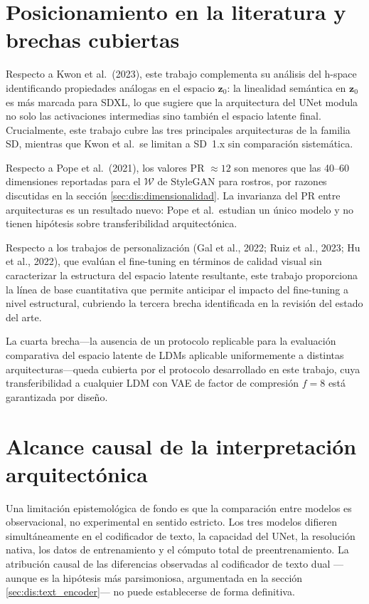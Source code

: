 \documentclass[12pt, a4paper, twoside]{book}
\newcommand{\z}{\mathbf{z}}
\begin{document}
\section{Posicionamiento en la literatura y brechas cubiertas}
\label{sec:dis:literatura}

Respecto a Kwon et al.\ (2023), este trabajo complementa su análisis del h-space identificando propiedades análogas en el espacio $\z_0$: la linealidad semántica en $\z_0$ es más marcada para SDXL, lo que sugiere que la arquitectura del UNet modula no solo las activaciones intermedias sino también el espacio latente final. Crucialmente, este trabajo cubre las tres principales arquitecturas de la familia SD, mientras que Kwon et al.\ se limitan a SD~1.x sin comparación sistemática.

Respecto a Pope et al.\ (2021), los valores PR $\approx 12$ son menores que las 40--60 dimensiones reportadas para el $\mathcal{W}$ de StyleGAN para rostros, por razones discutidas en la sección \ref{sec:dis:dimensionalidad}. La invarianza del PR entre arquitecturas es un resultado nuevo: Pope et al.\ estudian un único modelo y no tienen hipótesis sobre transferibilidad arquitectónica.

Respecto a los trabajos de personalización (Gal et al., 2022; Ruiz et al., 2023; Hu et al., 2022), que evalúan el fine-tuning en términos de calidad visual sin caracterizar la estructura del espacio latente resultante, este trabajo proporciona la línea de base cuantitativa que permite anticipar el impacto del fine-tuning a nivel estructural, cubriendo la tercera brecha identificada en la revisión del estado del arte.

La cuarta brecha---la ausencia de un protocolo replicable para la evaluación comparativa del espacio latente de LDMs aplicable uniformemente a distintas arquitecturas---queda cubierta por el protocolo desarrollado en este trabajo, cuya transferibilidad a cualquier LDM con VAE de factor de compresión $f=8$ está garantizada por diseño.

\section{Alcance causal de la interpretación arquitectónica}
\label{sec:dis:causalidad}

Una limitación epistemológica de fondo es que la comparación entre modelos es observacional, no experimental en sentido estricto. Los tres modelos difieren simultáneamente en el codificador de texto, la capacidad del UNet, la resolución nativa, los datos de entrenamiento y el cómputo total de preentrenamiento. La atribución causal de las diferencias observadas al codificador de texto dual ---aunque es la hipótesis más parsimoniosa, argumentada en la sección \ref{sec:dis:text_encoder}--- no puede establecerse de forma definitiva.
\end{document}
